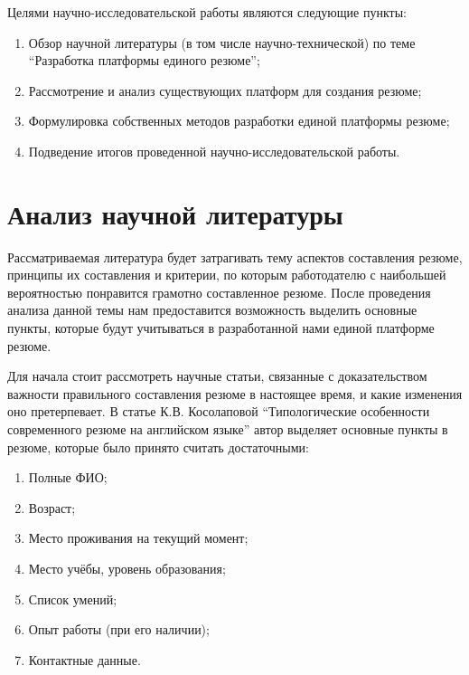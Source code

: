 \documentclass[master, och, pract]{SCWorks}
\begin{document}
Целями научно-исследовательской работы являются следующие пункты:
\begin{enumerate}
    \item Обзор научной литературы (в том числе научно-технической) по теме 
    “Разработка платформы единого резюме”;
    \item Рассмотрение и анализ существующих платформ для создания резюме;
    \item Формулировка собственных методов разработки единой платформы резюме;
    \item Подведение итогов проведенной научно-исследовательской работы.
\end{enumerate}


\section{Анализ научной литературы}
Рассматриваемая литература будет затрагивать тему аспектов составления резюме, принципы 
их составления и критерии, по которым работодателю с наибольшей вероятностью понравится 
грамотно составленное резюме. После проведения анализа данной темы нам предоставится 
возможность выделить основные пункты, которые будут учитываться в разработанной нами 
единой платформе резюме. 

Для начала стоит рассмотреть научные статьи, связанные с доказательством важности 
правильного составления резюме в настоящее время, и какие изменения  оно претерпевает. 
В статье К.В. Косолаповой “Типологические особенности современного резюме на английском 
языке” автор выделяет основные пункты в резюме, которые было принято считать достаточными:
\begin{enumerate}
    \item Полные ФИО;
    \item Возраст;
    \item Место проживания на текущий момент;
    \item Место учёбы, уровень образования;
    \item Список умений;
    \item Опыт работы (при его наличии);
    \item Контактные данные.
\end{enumerate}
\end{document}
